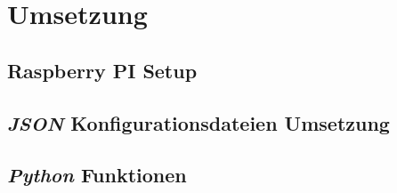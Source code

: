 \ifoot{\pezze}
\chapter{Umsetzung} 

\section{Raspberry PI Setup}


\newpage
\ifoot{\pezze}
\section{\textit{JSON} Konfigurationsdateien Umsetzung}
%


\newpage
\ifoot{\schneider}


\newpage
\ifoot{\pezze}
\section{\textit{Python} Funktionen}



